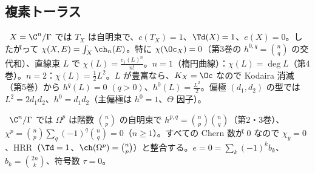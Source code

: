 \subsection{複素トーラス}
\begin{ex}[複素トーラス]\label{ex:torus}\tP\
$X=\C^n/\Gamma$ では $T_X$ は自明束で、$c(T_X)=1$、$\Td(X)=1$、$e(X)=0$。したがって $\chi(X,E)=\int_X\ch_n(E)$。特に $\chi(\Oc_X)=0$（第3巻の $h^{0,q}=\binom nq$ の交代和）、直線束 $L$ で $\chi(L)=\frac{c_1(L)^n}{n!}$。$n=1$（楕円曲線）：$\chi(L)=\deg L$（第4巻）。$n=2$：$\chi(L)=\frac12L^2$。$L$ が豊富なら、$K_X=\Oc$ なので Kodaira 消滅（第5巻）から $h^q(L)=0$ $(q>0)$、$h^0(L)=\frac{L^2}2$。偏極 $(d_1,d_2)$ の型では $L^2=2d_1d_2$、$h^0=d_1d_2$（主偏極は $h^0=1$、$\Theta$ 因子）。
\end{ex}


\begin{ex}[トーラスの $\chi_y$]\label{ex:torusHodge}\tP\
$\C^n/\Gamma$ では $\Omega^p$ は階数 $\binom np$ の自明束で $h^{p,q}=\binom np\binom nq$（第2・3巻）、$\chi^p=\binom np\sum_q(-1)^q\binom nq=0$（$n\ge1$）。すべての Chern 数が $0$ なので $\chi_y=0$、HRR（$\Td=1$、$\ch(\Omega^p)=\binom np$）と整合する。$e=0=\sum_k(-1)^kb_k$、$b_k=\binom{2n}k$、符号数 $\tau=0$。
\end{ex}
